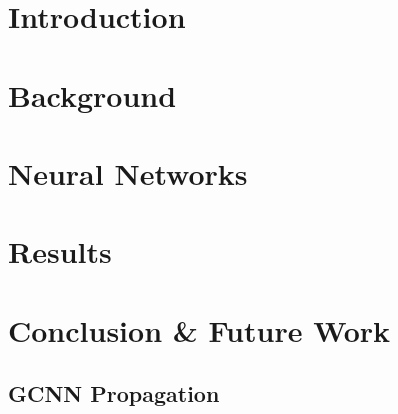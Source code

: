 


	
	\linenumbers
	\newpage
	\section{Introduction}\label{sec:Intro}
	

	\section{Background}\label{sec:BG}
	

	\section{Neural Networks}\label{sec:NN}
	


	\newpage %
	\section{Results}\label{sec:Results}
	

	\section{Conclusion \& Future Work}\label{sec:Conc}
	

	\newpage
	\begin{appendices}
	\section{GCNN Propagation}\label{app:GCNN-Prop}
	
	\end{appendices}

	\newpage
	
	


